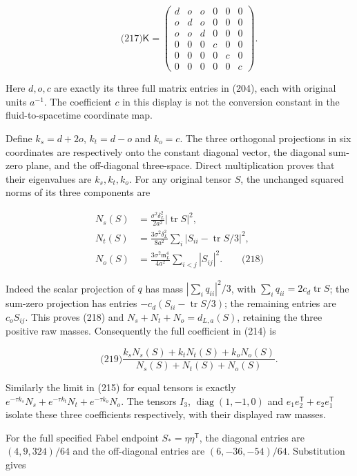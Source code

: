 \[
\qquad\text{(217)}
 \mathsf K=\begin{pmatrix}
 d&o&o&0&0&0\\o&d&o&0&0&0\\o&o&d&0&0&0\\
 0&0&0&c&0&0\\0&0&0&0&c&0\\0&0&0&0&0&c
 \end{pmatrix}.
\]

Here \(d,o,c\) are exactly its three full matrix entries in (204), each
with original units \(a^{-1}\). The coefficient \(c\) in this display is
not the conversion constant in the fluid-to-spacetime coordinate map.

Define \(k_s=d+2o\), \(k_t=d-o\) and \(k_o=c\). The three orthogonal
projections in six coordinates are respectively onto the constant
diagonal vector, the diagonal sum-zero plane, and the off-diagonal
three-space. Direct multiplication proves that their eigenvalues are
\(k_s,k_t,k_o\). For any original tensor \(S\), the unchanged squared
norms of its three components are

\[
\begin{aligned}
 N_s(S)&=\frac{\sigma^2\delta_L^2}{2a^2}|\operatorname{tr}S|^2,\\
 N_t(S)&=\frac{3\sigma^2\delta_L^2}{8a^2}
                 \sum_i|S_{ii}-\operatorname{tr}S/3|^2,\\
 N_o(S)&=\frac{3\sigma^2\mathfrak m_L^4}{4a^2}
                 \sum_{i<j}|S_{ij}|^2.
 \qquad\text{(218)}
\end{aligned}
\]

Indeed the scalar projection of \(q\) has mass \(|\sum_iq_{ii}|^2/3\),
with \(\sum_iq_{ii}=2c_d\operatorname{tr}S\); the sum-zero projection
has entries \(-c_d(S_{ii}-\operatorname{tr}S/3)\); the remaining entries
are \(c_oS_{ij}\). This proves (218) and \(N_s+N_t+N_o=d_{L,a}(S)\),
retaining the three positive raw masses. Consequently the full
coefficient in (214) is

\[
\qquad\text{(219)}
 \frac{k_sN_s(S)+k_tN_t(S)+k_oN_o(S)}{N_s(S)+N_t(S)+N_o(S)}.
\]

Similarly the limit in (215) for equal tensors is exactly
\(e^{-\tau k_s}N_s+e^{-\tau k_t}N_t+e^{-\tau k_o}N_o\). The tensors
\(I_3\), \(\operatorname{diag}(1,-1,0)\) and
\(e_1e_2^{\mathsf T}+e_2e_1^{\mathsf T}\) isolate these three
coefficients respectively, with their displayed raw masses.

For the full specified Fabel endpoint \(S_*=\eta\eta^{\mathsf T}\), the
diagonal entries are \((4,9,324)/64\) and the off-diagonal entries are
\((6,-36,-54)/64\). Substitution gives

